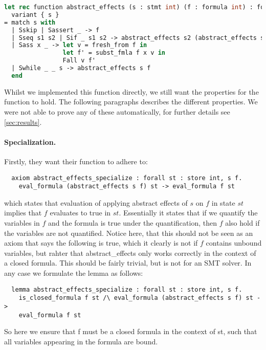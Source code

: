 \begin{lstlisting}[caption={Implementation of the \texttt{abstract\_effects} function},label={lst:abstracteff},language=sml]
let rec function abstract_effects (s : stmt int) (f : formula int) : formula int
  variant { s }
= match s with
  | Sskip | Sassert _ -> f
  | Sseq s1 s2 | Sif _ s1 s2 -> abstract_effects s2 (abstract_effects s1 f)
  | Sass x _ -> let v = fresh_from f in
                let f' = subst_fmla f x v in
                Fall v f'
  | Swhile _ _ s -> abstract_effects s f
  end
\end{lstlisting}

Whilst we implemented this function directly, we still want the properties for the function to hold.
The following paragraphs describes the different properties. We were not able to prove any of these automatically, for further details see \ref{sec:results}.

\paragraph{Specialization.} Firstly, they want their function to adhere to:

\begin{lstlisting}
  axiom abstract_effects_specialize : forall st : store int, s f.
    eval_formula (abstract_effects s f) st -> eval_formula f st
\end{lstlisting}

which states that evaluation of applying abstract effects of $s$ on $f$ in state $st$ implies that $f$ evaluates to true in $st$. Essentially it states that if we quantify the variables in $f$ and the formula is true under the quantification, then $f$ also hold if the variables are not quantified.
Notice here, that this should not be seen as an axiom that says the following is true, which it clearly is not
if $f$ contains unbound variables, but rahter that abstract_effects only works correctly in the context of a closed formula. This should be fairly trivial, but is not for an SMT solver. In any case we formulate the lemma as follows:

\begin{lstlisting}
  lemma abstract_effects_specialize : forall st : store int, s f.
    is_closed_formula f st /\ eval_formula (abstract_effects s f) st ->
    eval_formula f st
\end{lstlisting}

So here we ensure that f must be a closed formula in the context of st, such that all variables appearing in the formula are bound.

